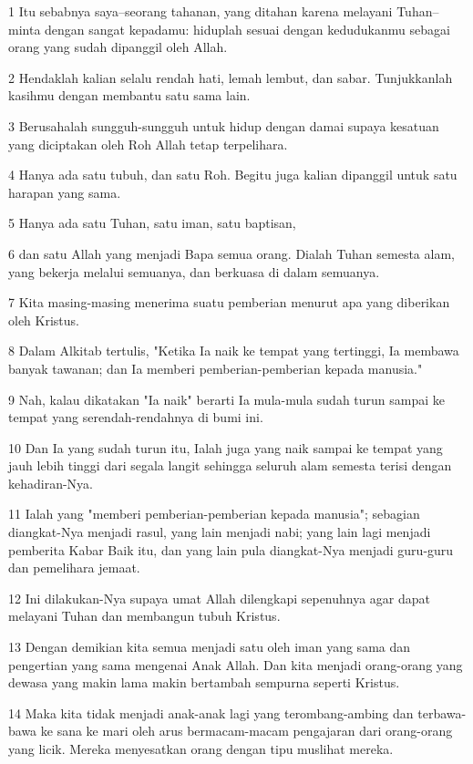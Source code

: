 \par 1 Itu sebabnya saya--seorang tahanan, yang ditahan karena melayani Tuhan--minta dengan sangat kepadamu: hiduplah sesuai dengan kedudukanmu sebagai orang yang sudah dipanggil oleh Allah.
\par 2 Hendaklah kalian selalu rendah hati, lemah lembut, dan sabar. Tunjukkanlah kasihmu dengan membantu satu sama lain.
\par 3 Berusahalah sungguh-sungguh untuk hidup dengan damai supaya kesatuan yang diciptakan oleh Roh Allah tetap terpelihara.
\par 4 Hanya ada satu tubuh, dan satu Roh. Begitu juga kalian dipanggil untuk satu harapan yang sama.
\par 5 Hanya ada satu Tuhan, satu iman, satu baptisan,
\par 6 dan satu Allah yang menjadi Bapa semua orang. Dialah Tuhan semesta alam, yang bekerja melalui semuanya, dan berkuasa di dalam semuanya.
\par 7 Kita masing-masing menerima suatu pemberian menurut apa yang diberikan oleh Kristus.
\par 8 Dalam Alkitab tertulis, "Ketika Ia naik ke tempat yang tertinggi, Ia membawa banyak tawanan; dan Ia memberi pemberian-pemberian kepada manusia."
\par 9 Nah, kalau dikatakan "Ia naik" berarti Ia mula-mula sudah turun sampai ke tempat yang serendah-rendahnya di bumi ini.
\par 10 Dan Ia yang sudah turun itu, Ialah juga yang naik sampai ke tempat yang jauh lebih tinggi dari segala langit sehingga seluruh alam semesta terisi dengan kehadiran-Nya.
\par 11 Ialah yang "memberi pemberian-pemberian kepada manusia"; sebagian diangkat-Nya menjadi rasul, yang lain menjadi nabi; yang lain lagi menjadi pemberita Kabar Baik itu, dan yang lain pula diangkat-Nya menjadi guru-guru dan pemelihara jemaat.
\par 12 Ini dilakukan-Nya supaya umat Allah dilengkapi sepenuhnya agar dapat melayani Tuhan dan membangun tubuh Kristus.
\par 13 Dengan demikian kita semua menjadi satu oleh iman yang sama dan pengertian yang sama mengenai Anak Allah. Dan kita menjadi orang-orang yang dewasa yang makin lama makin bertambah sempurna seperti Kristus.
\par 14 Maka kita tidak menjadi anak-anak lagi yang terombang-ambing dan terbawa-bawa ke sana ke mari oleh arus bermacam-macam pengajaran dari orang-orang yang licik. Mereka menyesatkan orang dengan tipu muslihat mereka.
